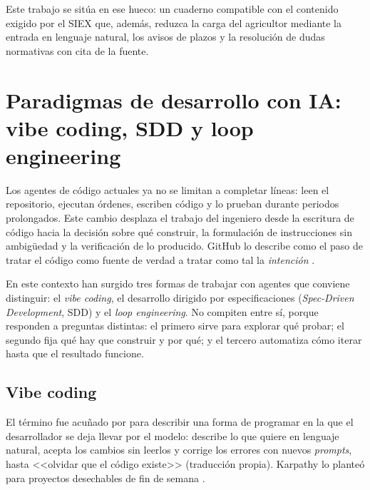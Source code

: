 
Este trabajo se sitúa en ese hueco: un cuaderno compatible con el contenido exigido por el SIEX que, además, reduzca la carga del agricultor mediante la entrada en lenguaje natural, los avisos de plazos y la resolución de dudas normativas con cita de la fuente.

\section{Paradigmas de desarrollo con IA: vibe coding, SDD y loop engineering}\label{sec:Paradigmas}

Los agentes de código actuales ya no se limitan a completar líneas: leen el repositorio, ejecutan órdenes, escriben código y lo prueban durante periodos prolongados. Este cambio desplaza el trabajo del ingeniero desde la escritura de código hacia la decisión sobre qué construir, la formulación de instrucciones sin ambigüedad y la verificación de lo producido. GitHub lo describe como el paso de tratar el código como fuente de verdad a tratar como tal la \emph{intención} \citep{delimarsky2025sdd}.

En este contexto han surgido tres formas de trabajar con agentes que conviene distinguir: el \emph{vibe coding}, el desarrollo dirigido por especificaciones (\emph{Spec-Driven Development}, SDD) y el \emph{loop engineering}. No compiten entre sí, porque responden a preguntas distintas: el primero sirve para explorar qué probar; el segundo fija qué hay que construir y por qué; y el tercero automatiza cómo iterar hasta que el resultado funcione.

\subsection{Vibe coding}\label{subsec:VibeCoding}

El término fue acuñado por \citet{karpathy2025vibe} para describir una forma de programar en la que el desarrollador se deja llevar por el modelo: describe lo que quiere en lenguaje natural, acepta los cambios sin leerlos y corrige los errores con nuevos \emph{prompts}, hasta <<olvidar que el código existe>> (traducción propia). Karpathy lo planteó para proyectos desechables de fin de semana \citep{willison2025vibe}.

